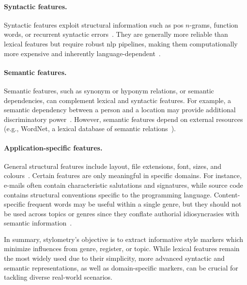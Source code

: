 \paragraph{Syntactic features.}
Syntactic features exploit structural information such as \ac{pos} $n$-grams, function words, or recurrent syntactic errors~\citep{stamatatos_survey_2009,abbasi_writeprints_2008}.
They are generally more reliable than lexical features but require robust \ac{nlp} pipelines, making them computationally more expensive and inherently language-dependent~\citep{neal_surveying_2018,stamatatos_survey_2009}.

\paragraph{Semantic features.}
Semantic features, such as synonym or hyponym relations, or semantic dependencies, can complement lexical and syntactic features. 
For example, a semantic dependency between a person and a location may provide additional discriminatory power~\citep{stamatatos_survey_2009,neal_surveying_2018}. 
However, semantic features depend on external resources (e.g., WordNet, a lexical database of semantic relations~\citep{zhou_paraphrase_2025}).


\paragraph{Application-specific features.} %
General structural features include layout, file extensions, font, sizes, and colours~\citep{abbasi_writeprints_2008,neal_surveying_2018}.
Certain features are only meaningful in specific domains. 
For instance, e-mails often contain characteristic salutations and signatures, while source code contains structural conventions specific to the programming language. 
Content-specific frequent words may be useful within a single genre, but they should not be used across topics or genres since they conflate authorial idiosyncrasies with semantic information~\citep{abbasi_writeprints_2008}.


In summary, stylometry's objective is to extract informative style markers which minimize influences from genre, register, or topic. 
While lexical features remain the most widely used due to their simplicity, more advanced syntactic and semantic representations, as well as domain-specific markers, can be crucial for tackling diverse real-world scenarios.
